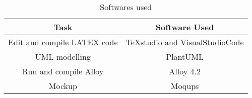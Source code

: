 \begin{flushleft}

\begin{table}[htp]
	\centering

\begin{tabular}{|c|c|}
\hline
Task&Software Used\\
\hline
Edit and compile LATEX code&TeXstudio and VisualStudioCode\\
\hline
UML modelling&PlantUML\\
\hline
Run and compile Alloy&Alloy 4.2\\
\hline
Mockup&Moqups\\
\hline

\end{tabular}

\caption{Softwares used} 

\end{table}

\end{flushleft}